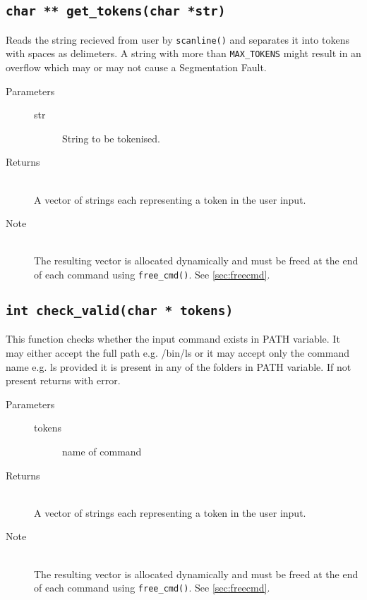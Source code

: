 \documentclass{article}
\begin{document}
\subsection{\lstinline{char ** get_tokens(char *str)}} \label{sec:gettokens}
Reads the string recieved from user by \lstinline{scanline()} and separates it into tokens with spaces as delimeters. A string with more than \lstinline{MAX_TOKENS} might result in an overflow which may or may not cause a Segmentation Fault.
\begin{description}
	\item[Parameters]\hfill
	\begin{description}
		\item[str] String to be tokenised.
	\end{description}
	\item[Returns]\hfill\\
		A vector of strings each representing a token in the user input.
	\item[Note]\hfill\\
		The resulting vector is allocated dynamically and must be freed at the end of each command using \lstinline{free_cmd()}. See \ref{sec:freecmd}.
\end{description}

\subsection{\lstinline{int check_valid(char * tokens)}}
This function checks whether the input command exists in PATH variable. It may either accept the full path e.g. /bin/ls or it may accept only the command name e.g. ls provided it is present in any of the folders in PATH variable. If not present returns with error.
\begin{description}
	\item[Parameters]\hfill
	\begin{description}
		\item[tokens] name of command
	\end{description}
	\item[Returns]\hfill\\
		A vector of strings each representing a token in the user input.
	\item[Note]\hfill\\
		The resulting vector is allocated dynamically and must be freed at the end of each command using \lstinline{free_cmd()}. See \ref{sec:freecmd}.
\end{description}
\end{document}
